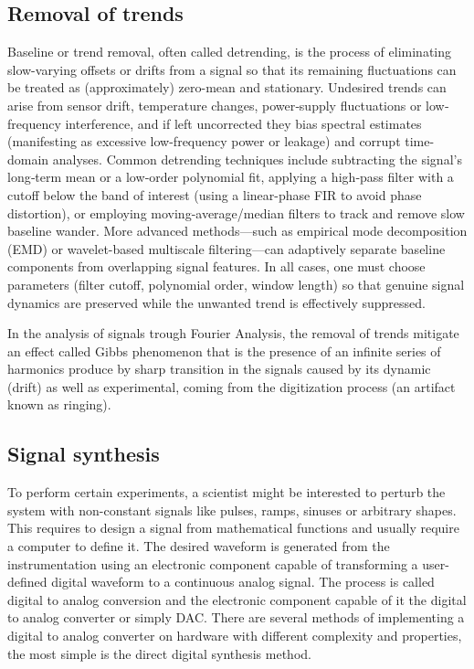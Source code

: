 \subsection{Removal of trends}
Baseline or trend removal, often called detrending, is the process of eliminating slow-varying offsets or drifts from a signal so that its remaining fluctuations can be treated as (approximately) zero-mean and stationary.  Undesired trends can arise from sensor drift, temperature changes, power‐supply fluctuations or low‐frequency interference, and if left uncorrected they bias spectral estimates (manifesting as excessive low-frequency power or leakage) and corrupt time-domain analyses.  Common detrending techniques include subtracting the signal’s long‐term mean or a low‐order polynomial fit, applying a high‐pass filter with a cutoff below the band of interest (using a linear-phase FIR to avoid phase distortion), or employing moving-average/median filters to track and remove slow baseline wander.  More advanced methods—such as empirical mode decomposition (EMD) or wavelet-based multiscale filtering—can adaptively separate baseline components from overlapping signal features.  In all cases, one must choose parameters (filter cutoff, polynomial order, window length) so that genuine signal dynamics are preserved while the unwanted trend is effectively suppressed.

In the analysis of signals trough Fourier Analysis, the removal of trends mitigate an effect called Gibbs phenomenon that is the presence of an infinite series of harmonics produce by sharp transition in the signals caused by its dynamic (drift) as well as experimental, coming from the digitization process (an artifact known as ringing).

\subsection{Signal synthesis}

To perform certain experiments, a scientist might be interested to perturb the system with non-constant signals like pulses, ramps, sinuses or arbitrary shapes. This requires to design a signal from mathematical functions and usually require a computer to define it. The desired waveform is generated from the instrumentation using an electronic component capable of transforming a user-defined digital waveform to a continuous analog signal. The process is called digital to analog conversion and the electronic component capable of it the digital to analog converter or simply DAC. There are several methods of implementing a digital to analog converter on hardware with different complexity and properties, the most simple is the direct digital synthesis method.

